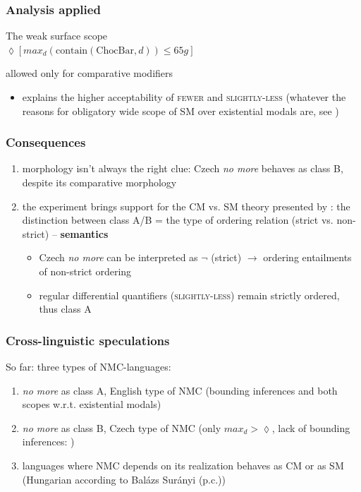 \documentclass[10pt
]{beamer}
\newcommand{\cond}[1]{\textsc{#1}}
\begin{document}
\begin{frame}
  \frametitle{Analysis applied}

  The weak surface scope\\
  
  $\lozenge[max_d(\mathrm{contain}(\mathrm{ChocBar},d)) \leq 65g]$
  
  allowed only for comparative modifiers
  
\begin{itemize}
  \item explains the higher acceptability of \cond{fewer} and
  \cond{slightly-less} (whatever the reasons for obligatory wide scope of SM over existential modals are, see \cite{blok2019scope})
\end{itemize}
  
\end{frame}

\begin{frame}
  \frametitle{Consequences}

\begin{enumerate}
  \item morphology isn't always the right clue: Czech \textit{no more} behaves as class B, despite its comparative morphology
  \item the experiment brings support for the CM vs. SM theory presented by \cite{kennedy2015fregean}: the distinction between class A/B = the type of ordering relation (strict vs. non-strict) -- \textbf{semantics}

  \begin{itemize}
    \item Czech \textit{no more} can be interpreted as $\neg$ (strict) $\rightarrow$ ordering entailments of non-strict ordering
    \item regular differential quantifiers (\cond{slightly-less}) remain strictly ordered, thus class A
  \end{itemize}

\end{enumerate}

\end{frame}

\begin{frame}
  \frametitle{Cross-linguistic speculations}

  So far: three types of NMC-languages: 
  
  \begin{enumerate}
    \item \textit{no more} as class A, English type of NMC (bounding inferences and both scopes w.r.t. existential modals)
    \item \textit{no more} as class B, Czech type of NMC (only $max_d > \lozenge$, lack of bounding inferences: \cite{docekal_upper_2017})
    \item languages where NMC depends on its realization behaves as CM or as SM (Hungarian according to Balázs Surányi (p.c.))
  \end{enumerate}
  
\end{frame}
\end{document}
